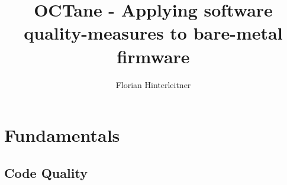 \documentclass[master,english,smartquotes,apa]{hgbthesis}
\title{OCTane - Applying software quality-measures to bare-metal firmware}
\author{Florian Hinterleitner}
\begin{document}
\frontmatter                                   %
\maketitle

\tableofcontents

		
			

\mainmatter                                    %


\chapter{Fundamentals}
\label{cha:Fundamentals}
	\section{Code Quality}
\end{document}

